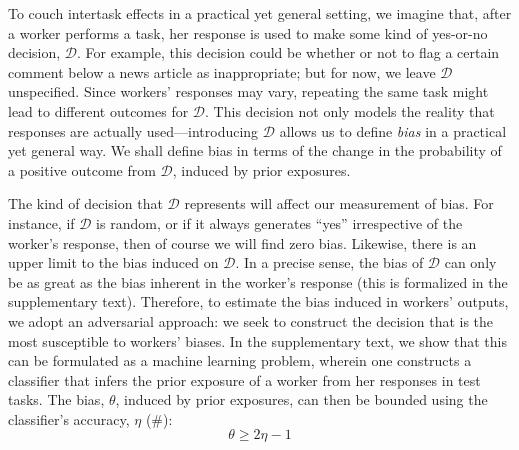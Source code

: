 \documentclass[12pt]{article}
\begin{document}
To couch intertask effects in a practical yet general setting, we imagine
that, after a worker performs a task, her response is used to make some 
kind of yes-or-no decision, $\mathcal{D}$.  For example, this decision 
could be whether or not to flag a certain comment
below a news article as inappropriate; but for now, we leave 
$\mathcal{D}$ unspecified.  Since workers' responses may
vary, repeating the same task might lead to different outcomes for 
$\mathcal{D}$.  This decision not only models the reality that responses are
actually used---introducing $\mathcal{D}$ allows us to define \textit{bias}
in a practical yet general way. We shall define bias in terms of the
change in the probability of a positive outcome from $\mathcal{D}$, induced 
by prior exposures.

The kind of decision that $\mathcal{D}$ represents will affect our 
measurement of bias.  For instance, if $\mathcal{D}$ is random, or if 
it always generates ``yes'' 
irrespective of the worker's response, then of course we will 
find zero bias.  Likewise, there is an upper limit to the bias induced on $\mathcal{D}$. In a precise sense, the bias of $\mathcal{D}$ can only be as
great as the bias inherent in the worker's response 
(this is formalized in the supplementary text).  Therefore, to estimate the 
bias induced in workers' outputs, we adopt an 
adversarial approach: we seek to construct the decision that 
is the most susceptible to workers' biases. In the supplementary text, we 
show that this can be formulated as a  machine learning problem, wherein one
constructs a classifier that infers the prior exposure of a worker from her 
responses in test tasks.  The bias, $\theta$, induced by 
prior exposures, can then be bounded using the classifier's accuracy, 
$\eta$ (\#):
\begin{equation}
	\theta \geq 2\eta - 1
	\label{l1}
\end{equation}
\end{document}
